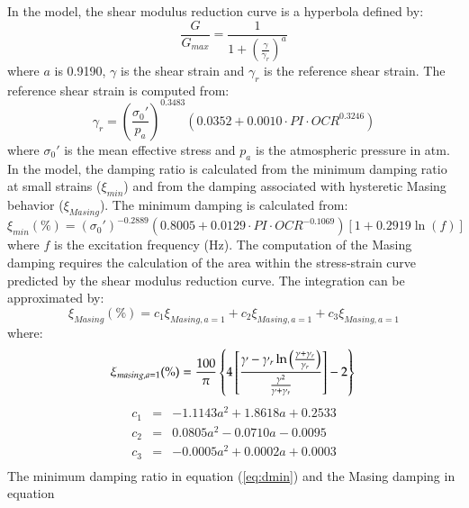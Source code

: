 \documentclass[11pt]{report}
\begin{document}
In the \citet{darendeli:01} model, the shear modulus reduction curve is a hyperbola defined by:
\begin{equation}
  \frac{G}{G_{max}} = \frac{1}{1 + \left( \frac{\gamma}{\gamma_r} \right)^{a}}
  \label{eq:shearmod}
\end{equation}
where $a$ is 0.9190, $\gamma$ is the shear strain and $\gamma_r$ is the reference shear strain.  The reference
shear strain is computed from:
\begin{equation}
  \gamma_r = \left(\frac{\sigma_0'}{p_a}\right)^{0.3483} \left( 0.0352 + 0.0010 \cdot PI \cdot OCR^{0.3246} \right)
\end{equation}
where $\sigma_0'$ is the mean effective stress and $p_a$ is the atmospheric pressure in atm. In the
model, the damping ratio is calculated from the minimum damping ratio at small strains ($\xi_{min}$)
and from the damping associated with hysteretic Masing behavior ($\xi_{Masing}$).  The minimum damping is
calculated from:
\begin{equation}
  \xi_{min}(\%) = (\sigma_0')^{-0.2889} \left( 0.8005 + 0.0129 \cdot PI \cdot OCR ^{-0.1069} \right) \left[
  1 + 0.2919 \ln\left( f \right) \right]
  \label{eq:dmin}
\end{equation}
where $f$ is the excitation frequency (Hz). The computation of the Masing damping requires the
calculation of the area within the stress-strain curve predicted by the shear modulus reduction
curve.  The integration can be approximated by:
\begin{equation}
  \xi_{Masing}(\%) = c_1 \xi_{Masing,a=1} + c_2 \xi_{Masing,a=1} + c_3 \xi_{Masing,a=1}
  \label{eq:dmasing}
\end{equation}
where:
\begin{equation}
  	\xi_{masing,a=1}(\%) = \frac{100}{\pi} \left\{ 4 \left[ \frac{\gamma - \gamma_r\ln\left( \frac{\gamma +
	\gamma_r}{\gamma_r} \right)}{\frac{\gamma^2}{\gamma+\gamma_r}} \right] - 2 \right\} \\
\end{equation}
\begin{equation}
  \begin{array}{rcl}
  	c_1 & = & -1.1143 a^2 + 1.8618 a + 0.2533 \\
	c_2 & = & 0.0805 a^2 - 0.0710 a - 0.0095 \\
	c_3 & = & -0.0005 a^2 + 0.0002 a + 0.0003 \\
  \end{array}
\end{equation}
The minimum damping ratio in equation (\ref{eq:dmin}) and the Masing damping in equation
\end{document}
